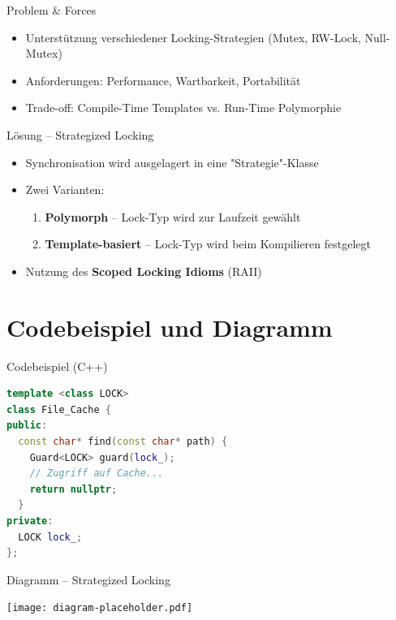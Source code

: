 \documentclass[aspectratio=169,10pt]{beamer}
\begin{document}
\begin{frame}{Problem \& Forces}
  \begin{itemize}
    \item Unterstützung verschiedener Locking-Strategien (Mutex, RW-Lock, Null-Mutex)
    \item Anforderungen: Performance, Wartbarkeit, Portabilität
    \item Trade-off: Compile-Time Templates vs. Run-Time Polymorphie
  \end{itemize}
\end{frame}

\begin{frame}{Lösung – Strategized Locking}
  \begin{itemize}
    \item Synchronisation wird ausgelagert in eine "Strategie"-Klasse
    \item Zwei Varianten:
      \begin{enumerate}
        \item \textbf{Polymorph} – Lock-Typ wird zur Laufzeit gewählt
        \item \textbf{Template-basiert} – Lock-Typ wird beim Kompilieren festgelegt
      \end{enumerate}
    \item Nutzung des \textbf{Scoped Locking Idioms} (RAII)
  \end{itemize}
\end{frame}

\section{Codebeispiel und Diagramm}
\begin{frame}[fragile]{Codebeispiel (C++)}
\begin{lstlisting}[language=C++]
template <class LOCK>
class File_Cache {
public:
  const char* find(const char* path) {
    Guard<LOCK> guard(lock_);
    // Zugriff auf Cache...
    return nullptr;
  }
private:
  LOCK lock_;
};
\end{lstlisting}
\end{frame}

\begin{frame}{Diagramm – Strategized Locking}
  \begin{center}
    \texttt{[image: diagram-placeholder.pdf]}
  \end{center}
\end{frame}
\end{document}
